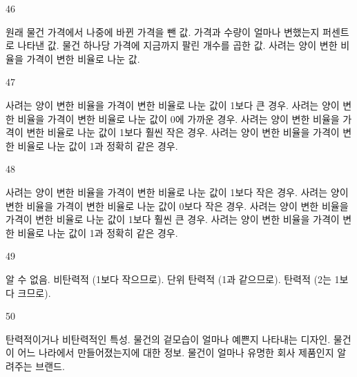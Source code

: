 \documentclass[fs9,seriesFre]{korfarm-base}
\begin{document}
\begin{kfSentenceUnit}{46}{}
\begin{kfChoices}
\kfChoice 원래 물건 가격에서 나중에 바뀐 가격을 뺀 값.
\kfChoice 가격과 수량이 얼마나 변했는지 퍼센트로 나타낸 값.
\kfChoice 물건 하나당 가격에 지금까지 팔린 개수를 곱한 값.
\kfChoice 사려는 양이 변한 비율을 가격이 변한 비율로 나눈 값.
\end{kfChoices}
\end{kfSentenceUnit}

\begin{kfSentenceUnit}{47}{}
\begin{kfChoices}
\kfChoice 사려는 양이 변한 비율을 가격이 변한 비율로 나눈 값이 1보다 큰 경우.
\kfChoice 사려는 양이 변한 비율을 가격이 변한 비율로 나눈 값이 0에 가까운 경우.
\kfChoice 사려는 양이 변한 비율을 가격이 변한 비율로 나눈 값이 1보다 훨씬 작은 경우.
\kfChoice 사려는 양이 변한 비율을 가격이 변한 비율로 나눈 값이 1과 정확히 같은 경우.
\end{kfChoices}
\end{kfSentenceUnit}

\begin{kfSentenceUnit}{48}{}
\begin{kfChoices}
\kfChoice 사려는 양이 변한 비율을 가격이 변한 비율로 나눈 값이 1보다 작은 경우.
\kfChoice 사려는 양이 변한 비율을 가격이 변한 비율로 나눈 값이 0보다 작은 경우.
\kfChoice 사려는 양이 변한 비율을 가격이 변한 비율로 나눈 값이 1보다 훨씬 큰 경우.
\kfChoice 사려는 양이 변한 비율을 가격이 변한 비율로 나눈 값이 1과 정확히 같은 경우.
\end{kfChoices}
\end{kfSentenceUnit}

\begin{kfSentenceUnit}{49}{}
\begin{kfChoices}
\kfChoice 알 수 없음.
\kfChoice 비탄력적 (1보다 작으므로).
\kfChoice 단위 탄력적 (1과 같으므로).
\kfChoice 탄력적 (2는 1보다 크므로).
\end{kfChoices}
\end{kfSentenceUnit}

\begin{kfSentenceUnit}{50}{}
\begin{kfChoices}
\kfChoice 탄력적이거나 비탄력적인 특성.
\kfChoice 물건의 겉모습이 얼마나 예쁜지 나타내는 디자인.
\kfChoice 물건이 어느 나라에서 만들어졌는지에 대한 정보.
\kfChoice 물건이 얼마나 유명한 회사 제품인지 알려주는 브랜드.
\end{kfChoices}
\end{kfSentenceUnit}
\end{document}
